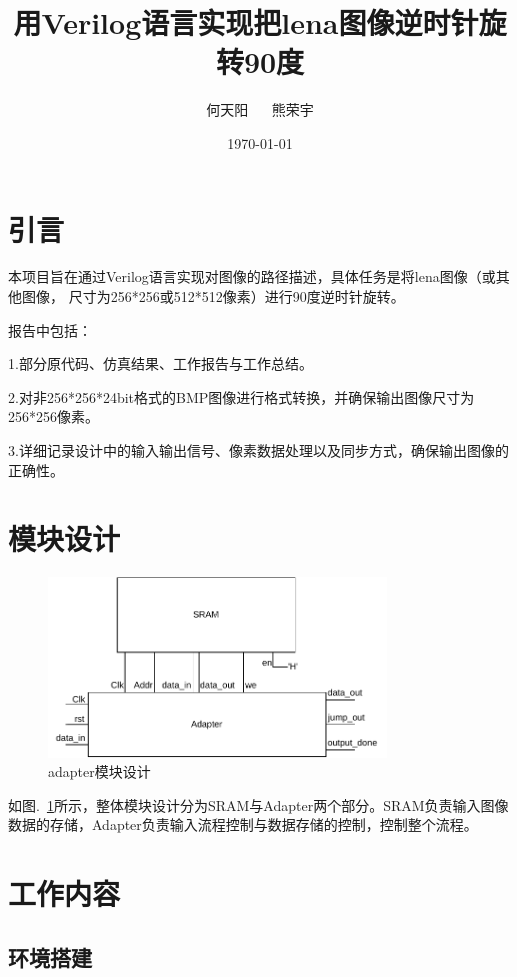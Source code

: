 \documentclass[12pt, a4paper]{article}
\title{用Verilog语言实现把lena图像逆时针旋转90度}
\author{何天阳 $\quad$ 熊荣宇}
\date{\today}
\begin{document}
\maketitle

\section{引言}
本项目旨在通过Verilog语言实现对图像的路径描述，具体任务是将lena图像（或其他图像，
尺寸为256*256或512*512像素）进行90度逆时针旋转。

报告中包括：

1.部分原代码、仿真结果、工作报告与工作总结。

2.对非256*256*24bit格式的BMP图像进行格式转换，并确保输出图像尺寸为256*256像素。

3.详细记录设计中的输入输出信号、像素数据处理以及同步方式，确保输出图像的正确性。

\section{模块设计}

\begin{figure}[H]
    \centering
    \includegraphics[width=0.8\textwidth]{images/struct.pdf}
    \caption{adapter模块设计}
    \label{fig:adapter}
\end{figure}

如图.~\ref{fig:adapter}所示，整体模块设计分为SRAM与Adapter两个部分。SRAM负责输入图像数据的存储，Adapter负责输入流程控制与数据存储的控制，控制整个流程。


\section{工作内容}

\subsection{环境搭建}
\end{document}
